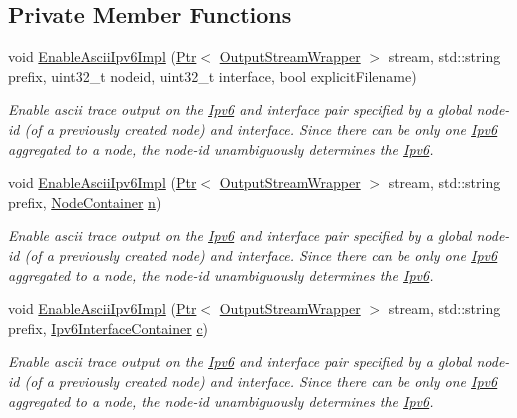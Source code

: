 \subsection*{Private Member Functions}
\begin{DoxyCompactItemize}
\item 
void \hyperlink{classns3_1_1AsciiTraceHelperForIpv6_a8d1116c40fc966e45ec721d2ff586175}{Enable\+Ascii\+Ipv6\+Impl} (\hyperlink{classns3_1_1Ptr}{Ptr}$<$ \hyperlink{classns3_1_1OutputStreamWrapper}{Output\+Stream\+Wrapper} $>$ stream, std\+::string prefix, uint32\+\_\+t nodeid, uint32\+\_\+t interface, bool explicit\+Filename)
\begin{DoxyCompactList}\small\item\em Enable ascii trace output on the \hyperlink{classns3_1_1Ipv6}{Ipv6} and interface pair specified by a global node-\/id (of a previously created node) and interface. Since there can be only one \hyperlink{classns3_1_1Ipv6}{Ipv6} aggregated to a node, the node-\/id unambiguously determines the \hyperlink{classns3_1_1Ipv6}{Ipv6}. \end{DoxyCompactList}\item 
void \hyperlink{classns3_1_1AsciiTraceHelperForIpv6_a2fc1a787da55721e0d8c83558b227cdd}{Enable\+Ascii\+Ipv6\+Impl} (\hyperlink{classns3_1_1Ptr}{Ptr}$<$ \hyperlink{classns3_1_1OutputStreamWrapper}{Output\+Stream\+Wrapper} $>$ stream, std\+::string prefix, \hyperlink{classns3_1_1NodeContainer}{Node\+Container} \hyperlink{lte__link__budget__x2__handover__measures_8m_abdb05bc5a064cf642a06c83b3392f148}{n})
\begin{DoxyCompactList}\small\item\em Enable ascii trace output on the \hyperlink{classns3_1_1Ipv6}{Ipv6} and interface pair specified by a global node-\/id (of a previously created node) and interface. Since there can be only one \hyperlink{classns3_1_1Ipv6}{Ipv6} aggregated to a node, the node-\/id unambiguously determines the \hyperlink{classns3_1_1Ipv6}{Ipv6}. \end{DoxyCompactList}\item 
void \hyperlink{classns3_1_1AsciiTraceHelperForIpv6_a2316825692c60ee2396f935b729a991d}{Enable\+Ascii\+Ipv6\+Impl} (\hyperlink{classns3_1_1Ptr}{Ptr}$<$ \hyperlink{classns3_1_1OutputStreamWrapper}{Output\+Stream\+Wrapper} $>$ stream, std\+::string prefix, \hyperlink{classns3_1_1Ipv6InterfaceContainer}{Ipv6\+Interface\+Container} \hyperlink{mmwave_2model_2fading-traces_2fading__trace__generator_8m_ae0323a9039add2978bf5b49550572c7c}{c})
\begin{DoxyCompactList}\small\item\em Enable ascii trace output on the \hyperlink{classns3_1_1Ipv6}{Ipv6} and interface pair specified by a global node-\/id (of a previously created node) and interface. Since there can be only one \hyperlink{classns3_1_1Ipv6}{Ipv6} aggregated to a node, the node-\/id unambiguously determines the \hyperlink{classns3_1_1Ipv6}{Ipv6}. \end{DoxyCompactList}\item 

\end{DoxyCompactItemize}

